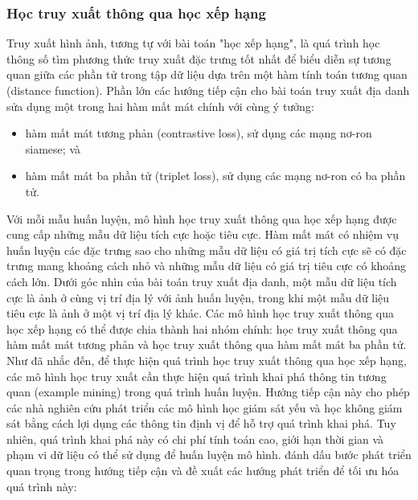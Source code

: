 \subsubsection{Học truy xuất thông qua học xếp hạng}

Truy xuất hình ảnh, tương tự với bài toán "học xếp hạng", là quá trình học thông số tìm phương thức truy xuất đặc trưng tốt nhất để biểu diễn sự tương quan giữa các phần tử trong tập dữ liệu dựa trên một hàm tính toán tương quan (distance function). Phần lớn các hướng tiếp cận cho bài toán truy xuất địa danh sửa dụng một trong hai hàm mất mát chính với cùng ý tưởng:

\begin{itemize}
    \item hàm mất mát tương phản (contrastive loss), sử dụng các mạng nơ-ron siamese\cite{ong2017siamese, GeM, randenovic2016BoW}; và
    \item hàm mất mát ba phần tử (triplet loss), sử dụng các mạng nơ-ron có ba phần tử\cite{arandjelović2016netvlad, gordo2016deep, gordo2017endtoend, wang2014learning, jin2017learned, zheng2018sift}.
\end{itemize}

Với mỗi mẫu huấn luyện, mô hình học truy xuất thông qua học xếp hạng được cung cấp những mẫu dữ liệu tích cực hoặc tiêu cực. Hàm mất mát có nhiệm vụ huấn luyện các đặc trưng sao cho những mẫu dữ liệu có giá trị tích cực sẽ có đặc trưng mang khoảng cách nhỏ và những mẫu dữ liệu có giá trị tiêu cực có khoảng cách lớn. Dưới góc nhìn của bài toán truy xuất địa danh, một mẫu dữ liệu tích cực là ảnh ở cùng vị trí địa lý với ảnh huấn luyện, trong khi một mẫu dữ liệu tiêu cực là ảnh ở một vị trí địa lý khác. Các mô hình học truy xuất thông qua học xếp hạng có thể được chia thành hai nhóm chính: học truy xuất thông qua hàm mất mát tương phản và học truy xuất thông qua hàm mất mát ba phần tử. Như đã nhắc đến, để thực hiện quá trình học truy xuất thông qua học xếp hạng, các mô hình học truy xuất cần thực hiện quá trình khai phá thông tin tương quan (example mining) trong quá trình huấn luyện. Hướng tiếp cận này cho phép các nhà nghiên cứu phát triển các mô hình học giám sát yếu\cite{arandjelović2016netvlad, jin2017learned} và học không giám sát\cite{radenovic2018fine} bằng cách lợi dụng các thông tin định vị để hỗ trợ quá trình khai phá. Tuy nhiên, quá trình khai phá này có chi phí tính toán cao, giới hạn thời gian và phạm vi dữ liệu có thể sử dụng để huấn luyện mô hình. \cite{arandjelović2016netvlad} đánh dấu bước phát triển quan trọng trong hướng tiếp cận và đề xuất các hướng phát triển để tối ưu hóa quá trình này:

